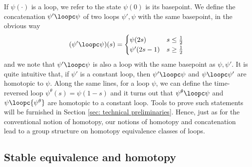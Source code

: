 If $\psi(\cdot)$ is a loop, we refer to the state $\psi(0)$ is its basepoint. We define the concatenation $\psi' \loopc \psi$ of two loops $\psi',\psi$ with the same basepoint, in the obvious way
\begin{equation} \label{eq: concatenation}
(\psi' \loopc \psi) (s) = \begin{cases} \psi(2s) &  s \leq \tfrac{1}{2}  \\
\psi'(2s-1) &  s \geq \tfrac{1}{2}  \\
\end{cases}
\end{equation}
and we note that $\psi' \loopc \psi$ is also a loop with the same basepoint as $\psi,\psi'$.
It is quite intuitive that, if $\psi'$ is a constant loop, then $\psi' \loopc \psi$ and $\psi \loopc \psi'$ are homotopic to $\psi$. Along the same lines, for a loop $\psi$, we can define the time-reversed loop ${\psi^{\theta}}(s)=\psi(1-s)$ and it turns out that ${\psi^{\theta}} \loopc\psi$ and $\psi\loopc{\psi^{\theta}}$ are  homotopic to a constant loop. Tools to prove such statements will be furnished in Section \ref{sec: technical preliminaries}. Hence, just as for the conventional notion of homotopy, our notions of homotopy and concatenation lead to a group structure  on homotopy equivalence classes of loops.  

\subsection{Stable equivalence and homotopy}  \label{sec: stable equivalence and homotopy}
